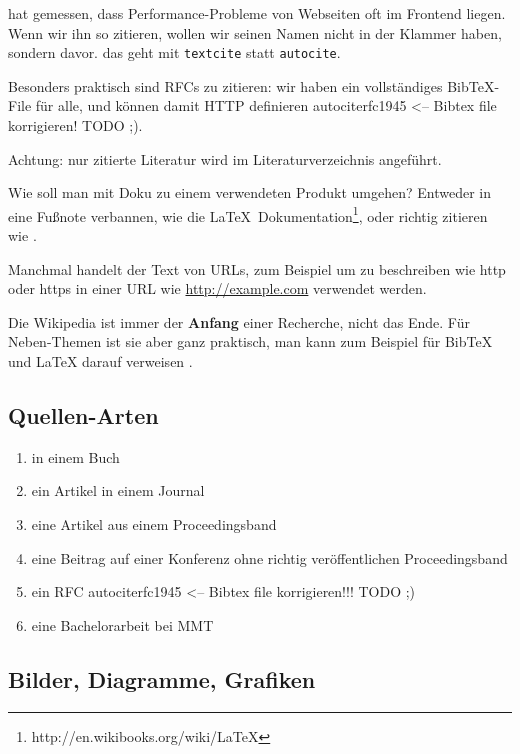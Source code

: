 \textcite{Souders:2007} hat gemessen, dass Performance-Probleme von Webseiten oft im Frontend liegen.
Wenn wir ihn so zitieren, wollen wir seinen Namen nicht in der Klammer haben, sondern davor. das geht
mit \texttt{textcite} statt \texttt{autocite}.

Besonders praktisch sind RFCs zu zitieren: wir haben ein vollständiges
BibTeX-File für alle, und können damit HTTP definieren autocite{rfc1945} <-- Bibtex file korrigieren! TODO ;).

Achtung: nur zitierte Literatur wird im Literaturverzeichnis angeführt.

Wie soll man mit Doku zu einem verwendeten Produkt umgehen?
Entweder in eine Fußnote verbannen, wie die \LaTeX\ Dokumentation\footnote{http://en.wikibooks.org/wiki/LaTeX},
oder richtig zitieren wie \autocite[]{jQueryDoc}.

Manchmal handelt der Text von URLs, zum Beispiel um zu
beschreiben wie http oder https in einer URL wie 
\url{http://example.com} verwendet werden.

Die Wikipedia ist immer der \textbf{Anfang}  einer Recherche, 
nicht das Ende. Für Neben-Themen ist sie aber ganz praktisch, 
man kann zum Beispiel für BibTeX und LaTeX darauf verweisen \autocites[BibTeX]{wikipedia:bibtex}[LaTeX]{wikipedia:latex}.

\subsection{Quellen-Arten}

\begin{enumerate}
\item in einem Buch \autocite[580-605]{Tanenbaum:2003}
\item ein Artikel in einem Journal \autocite{Renaud:2004}
\item eine Artikel aus einem Proceedingsband \autocite{Bailey:1981}
\item eine Beitrag auf einer Konferenz ohne richtig veröffentlichen Proceedingsband \autocite{Yacoub:1998}
\item ein RFC autocite{rfc1945} <-- Bibtex file korrigieren!!! TODO ;)
\item eine Bachelorarbeit bei MMT \autocite{Schmidt:2011}
\end{enumerate}


\subsection{Bilder, Diagramme, Grafiken}

